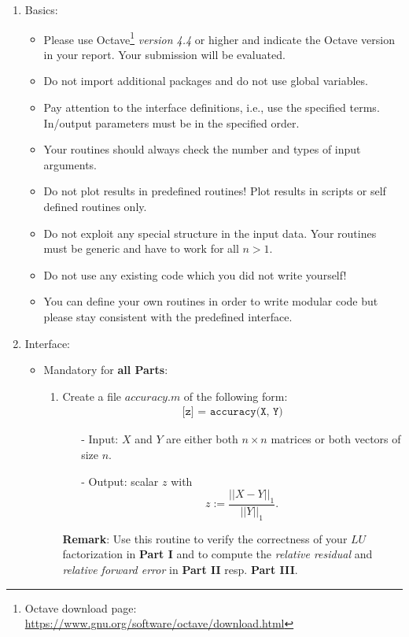 \documentclass{scrartcl}
\begin{document}
\begin{enumerate}
	\item Basics:
	\begin{itemize}
		\item Please use Octave\footnote{Octave download page: \url{https://www.gnu.org/software/octave/download.html}} \textit{version 4.4} or higher and indicate the Octave version in your report. Your submission will be evaluated.
		\item Do not import additional packages and do not use global variables.
		\item Pay attention to the interface definitions, i.e., use the specified terms. In/output parameters must be in the specified order.
		\item Your routines should always check the number and types of input arguments.
		\item Do not plot results in predefined routines! Plot results in scripts or self defined routines only.
		\item Do not exploit any special structure in the input data. Your routines must be generic and have to work for all $n > 1$.
		\item Do not use any existing code which you did not write yourself!
		\item You can define your own routines in order to write modular code but please stay consistent with the predefined interface.
	\end{itemize}
	
	\item Interface:
	\begin{itemize}
		\item Mandatory for \textbf{all Parts}:
			\begin{enumerate}
				\item Create a file $accuracy.m$ of the following form:
     		\begin{align*}
            	\texttt{[z] = accuracy(X, Y)}
        	\end{align*}
			\begin{itemize}
            	\item[-] Input: $X$ and $Y$ are either both $n \times n$ matrices or both vectors of size $n$.
            	\item[-] Output: scalar $z$ with
            		\begin{equation*}
	         			z := \frac{||X - Y||_1}{||Y||_1}.
            		\end{equation*}
        	\end{itemize}
        	\textbf{Remark}: Use this routine to verify the correctness of your $LU$ factorization in \textbf{Part I} and to compute the \textit{relative residual} and \textit{relative forward error} in \textbf{Part II} resp. \textbf{Part III}.\\
		\end{enumerate}
	

\end{itemize}
\end{enumerate}
\end{document}
